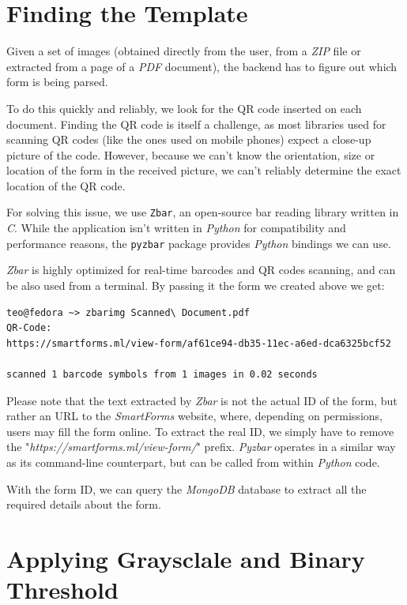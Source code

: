 \documentclass[11pt, a4paper]{report}
\def\code#1{\texttt{#1}}
\begin{document}
\section{Finding the Template}

Given a set of images (obtained directly from the user, from a \textit{ZIP} file or extracted from a page of a \textit{PDF} document), the backend has to figure out which form is being parsed.

To do this quickly and reliably, we look for the QR code inserted on each document. Finding the QR code is itself a challenge, as most libraries used for scanning QR codes (like the ones used on mobile phones) expect a close-up picture of the code. However, because we can't know the orientation, size or location of the form in the received picture, we can't reliably determine the exact location of the QR code.

For solving this issue, we use \code{Zbar}, an open-source bar reading library written in \textit{C}. While the application isn't written in \textit{Python} for compatibility and performance reasons, the \code{pyzbar} package provides \textit{Python} bindings we can use.

\textit{Zbar} is highly optimized for real-time barcodes and QR codes scanning, and can be also used from a terminal. By passing it the form we created above we get:


\begin{verbatim}
teo@fedora ~> zbarimg Scanned\ Document.pdf 
QR-Code:
https://smartforms.ml/view-form/af61ce94-db35-11ec-a6ed-dca6325bcf52

scanned 1 barcode symbols from 1 images in 0.02 seconds
\end{verbatim}

Please note that the text extracted by \textit{Zbar} is not the actual ID of the form, but rather an URL to the \textit{SmartForms} website, where, depending on permissions, users may fill the form online. To extract the real ID, we simply have to remove the "\textit{https://smartforms.ml/view-form/}" prefix. \textit{Pyzbar} operates in a similar way as its command-line counterpart, but can be called from within \textit{Python} code.

With the form ID, we can query the \textit{MongoDB} database to extract all the required details about the form.

\section{Applying Graysclale and Binary Threshold}
\end{document}
